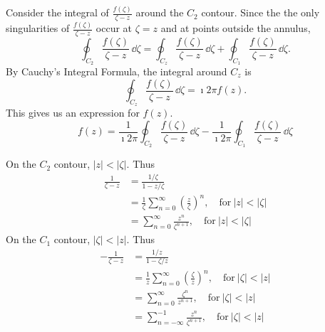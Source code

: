 Consider the integral of $\frac{f(\zeta)}{\zeta - z}$ around the $C_2$ contour.
Since the the only singularities of $\frac{f(\zeta)}{\zeta - z}$ occur at
$\zeta = z$ and at points outside the annulus,
\[ 
\oint_{C_2} \frac{f(\zeta)}{\zeta - z}\,\dd \zeta 
= \oint_{C_z} \frac{f(\zeta)}{\zeta - z}\,\dd \zeta
+ \oint_{C_1} \frac{f(\zeta)}{\zeta - z}\,\dd \zeta. 
\]
By Cauchy's Integral Formula, the integral around $C_z$ is
\[ 
\oint_{C_z} \frac{f(\zeta)}{\zeta - z}\,\dd \zeta = \imath 2 \pi f(z).
\]
This gives us an expression for $f(z)$.
\begin{equation}
  \label{eqn_fz_int_int} 
  f(z) = \frac{1}{\imath 2 \pi} \oint_{C_2} \frac{f(\zeta)}{\zeta - z}\,\dd \zeta 
  - \frac{1}{\imath 2 \pi} \oint_{C_1} \frac{f(\zeta)}{\zeta - z}\,\dd \zeta
\end{equation}

On the $C_2$ contour, $|z| < |\zeta|$.  Thus 
\begin{align*}
  \frac{1}{\zeta - z}
  &= \frac{1/\zeta}{1 - z/\zeta} 
  \\
  &= \frac{1}{\zeta} \sum_{n = 0}^\infty \left( \frac{z}{\zeta} \right)^n,
  \quad \mathrm{for}\ |z| < |\zeta| 
  \\
  &= \sum_{n = 0}^\infty \frac{ z^n }{ \zeta^{n+1} }, \quad \mathrm{for}\ |z| < |\zeta|
\end{align*}
On the $C_1$ contour, $|\zeta| < |z|$.  Thus
\begin{align*}
  - \frac{1}{\zeta - z} 
  &= \frac{1/z}{1 - \zeta/z} 
  \\
  &= \frac{1}{z} \sum_{n = 0}^\infty \left( \frac{\zeta}{z} \right)^n, 
  \quad \mathrm{for}\ |\zeta| < |z| 
  \\
  &= \sum_{n = 0}^\infty \frac{\zeta^n}{z^{n+1}}, \quad \mathrm{for}\ |\zeta| < |z| 
  \\
  &= \sum_{n = -\infty}^{-1} \frac{ z^n }{ \zeta^{n+1} }, \quad \mathrm{for}\ |\zeta| < |z| 
\end{align*}

